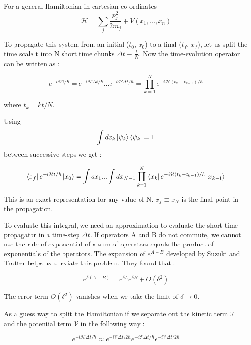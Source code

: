 

For a general Hamiltonian in cartesian co-ordinates $$\mathcal{H} = \sum_{j} \frac{p_j^2}{2m_j} + V(x_1, ..., x_n)$$

To propagate this system from an initial ($t_0$, $x_0$) to a final ($t_f$, $x_f$), let us split the time scale t into N short time chunks $\Delta t \equiv \frac{t}{N}$. Now the time-evolution operator can be written as :

\begin{equation} \label{4.x}
    e^{-i\mathcal{H}t/\hbar} = e^{-i\mathcal{H}\Delta t/\hbar}...e^{-i\mathcal{H}\Delta t/\hbar} = \prod_{k=1}^{N} e^{-i\mathcal{H}(t_k - t_{k-1})/\hbar}
\end{equation}

where $t_k = kt/N$. 

Using $$\int dx_k \ket{\psi_k}\bra{\psi_k} = 1$$ between successive steps we get :

\begin{equation} \label{4.xx}
    \bra{x_f} e^{-i\mathcal{H}t/\hbar} \ket{x_0} = \int dx_1 ... \int dx_{N-1} \prod_{k=1}^{N} \bra{x_k} e^{-i\mathcal{H}(t_k - t_{k-1})/\hbar} \ket{x_{k-1}}
\end{equation}

This is an exact representation for any value of N. $x_f \equiv x_N$ is the final point in the  propagation.

To evaluate this integral, we need an approximation to evaluate the short time propagator in a time-step $\Delta t$. If operators A and B do not commute, we cannot use the rule of exponential of a sum of operators equals the product of exponentials of the operators. The expansion of $e^{A+B}$ developed by Suzuki and Trotter helps us alleviate this problem. They found that :

\begin{equation}\label{4.x}
e^{\delta(A + B)} = e^{\delta A}e^{\delta B} + O(\delta^2)
\end{equation}

The error term $O(\delta^2)$ vanishes when we take the limit of $\delta \to 0$.

As a guess way to split the Hamiltonian if we separate out the kinetic term $\mathcal{T}$ and the potential term $\mathcal{V}$ in the following way :

\begin{equation}\label{4.x}
e^{-i\mathcal{H}\Delta t/\hbar} \approx e^{-i\mathcal{V}\Delta t/2\hbar}e^{-i\mathcal{T}\Delta t/\hbar}e^{-i\mathcal{V}\Delta t/2\hbar} 
\end{equation}

